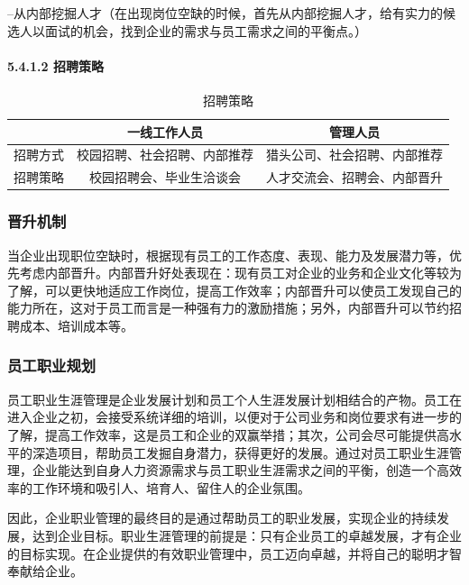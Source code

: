 \documentclass[10pt,letterpaper]{article}
\begin{document}
--从内部挖掘人才（在出现岗位空缺的时候，首先从内部挖掘人才，给有实力的候选人以面试的机会，找到企业的需求与员工需求之间的平衡点。）

\paragraph{5.4.1.2 招聘策略}

\rule{0pt}{0pt} 

\begin{table}[!htbp]
\centering
\begin{tabular}{|c|c|c|}
\hline
  & 一线工作人员 & 管理人员 \\
\hline
招聘方式 & 校园招聘、社会招聘、内部推荐 & 猎头公司、社会招聘、内部推荐 \\
\hline
招聘策略 & 校园招聘会、毕业生洽谈会 & 人才交流会、招聘会、内部晋升 \\
\hline
\end{tabular}
\caption{招聘策略}\label{tab:aStrangeTable}
\end{table}

\subsubsection{晋升机制}

当企业出现职位空缺时，根据现有员工的工作态度、表现、能力及发展潜力等，优先考虑内部晋升。内部晋升好处表现在：现有员工对企业的业务和企业文化等较为了解，可以更快地适应工作岗位，提高工作效率；内部晋升可以使员工发现自己的能力所在，这对于员工而言是一种强有力的激励措施；另外，内部晋升可以节约招聘成本、培训成本等。


\subsubsection{员工职业规划}

员工职业生涯管理是企业发展计划和员工个人生涯发展计划相结合的产物。员工在进入企业之初，会接受系统详细的培训，以便对于公司业务和岗位要求有进一步的了解，提高工作效率，这是员工和企业的双赢举措；其次，公司会尽可能提供高水平的深造项目，帮助员工发掘自身潜力，获得更好的发展。通过对员工职业生涯管理，企业能达到自身人力资源需求与员工职业生涯需求之间的平衡，创造一个高效率的工作环境和吸引人、培育人、留住人的企业氛围。

因此，企业职业管理的最终目的是通过帮助员工的职业发展，实现企业的持续发展，达到企业目标。职业生涯管理的前提是：只有企业员工的卓越发展，才有企业的目标实现。在企业提供的有效职业管理中，员工迈向卓越，并将自己的聪明才智奉献给企业。
\end{document}
